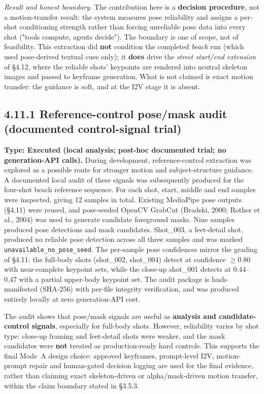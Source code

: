 \documentclass[10pt,twocolumn,letterpaper]{article}
\begin{document}
\emph{Result and honest boundary.} The contribution here is a \textbf{decision procedure}, not a motion-transfer result: the system measures pose reliability and assigns a per-shot conditioning strength rather than forcing unreliable pose data into every shot ("tools compute, agents decide"). The boundary is one of scope, not of feasibility. This extraction did \textbf{not} condition the completed \emph{beach} run (which used pose-derived textual cues only); it \textbf{does} drive the \emph{street start/end extension} of \S{}4.12, where the reliable shots' keypoints are rendered into neutral skeleton images and passed to keyframe generation. What is not claimed is exact motion transfer: the guidance is soft, and at the I2V stage it is absent.


\subsection*{4.11.1 Reference-control pose/mask audit (documented control-signal trial)}

\textbf{Type: Executed (local analysis; post-hoc documented trial; no generation-API calls).} During development, reference-control extraction was explored as a possible route for stronger motion and subject-structure guidance. A documented local audit of these signals was subsequently produced for the four-shot beach reference sequence. For each shot, start, middle and end samples were inspected, giving 12 samples in total. Existing MediaPipe pose outputs (\S{}4.11) were reused, and pose-seeded OpenCV GrabCut (Bradski, 2000; Rother et al., 2004) was used to generate candidate foreground masks. Nine samples produced pose detections and mask candidates. Shot\_003, a feet-detail shot, produced no reliable pose detection across all three samples and was marked \texttt{unavailable\_no\_pose\_seed}. The per-sample pose confidences mirror the grading of \S{}4.11: the full-body shots (shot\_002, shot\_004) detect at confidence $\ge$0.80 with near-complete keypoint sets, while the close-up shot\_001 detects at 0.44--0.47 with a partial upper-body keypoint set. The audit package is hash-manifested (SHA-256) with per-file integrity verification, and was produced entirely locally at zero generation-API cost.

The audit shows that pose/mask signals are useful as \textbf{analysis and candidate-control signals}, especially for full-body shots. However, reliability varies by shot type: close-up framing and feet-detail shots were weaker, and the mask candidates were \textbf{not} treated as production-ready hard controls. This supports the final Mode~A design choice: approved keyframes, prompt-level I2V, motion-prompt repair and human-gated decision logging are used for the final evidence, rather than claiming exact skeleton-driven or alpha/mask-driven motion transfer, within the claim boundary stated in \S{}3.5.3.
\end{document}
